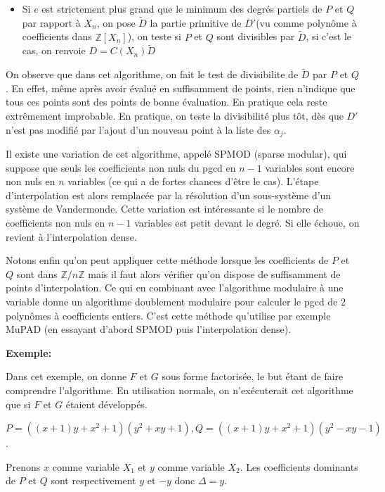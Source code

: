 \documentclass[a4paper,11pt]{book}
\begin{document}
\begin{giacjshere}
\begin{enumerate}
\begin{itemize}
\begin{itemize}
      \item Si $e$ est strictement plus grand que le minimum des degrés
      partiels de $P$ et $Q$ par rapport à $X_n$, on pose $\tilde{D}$ la
      partie primitive de $D' $(vu comme polynôme à coefficients dans
      $\mathbb{Z} [ X_n ]$), on teste si $P$ et $Q$ sont divisibles par
      $\tilde{D}$, si c'est le cas, on renvoie $D = C ( X_n ) \tilde{D}$
    \end{itemize}
  \end{itemize}
\end{enumerate}
On observe que dans cet algorithme, on fait le test de divisibilite de
$\tilde{D}$ par $P$ et $Q$. En effet, même après avoir évalué en suffisamment
de points, rien n'indique que tous ces points sont des points de bonne
évaluation. En pratique cela reste extrêmement improbable. En pratique, on
teste la divisibilité plus tôt, dès que $D'$ n'est pas modifié par l'ajout
d'un nouveau point à la liste des $\alpha_j$.

Il existe une variation de cet algorithme, appelé SPMOD (sparse modular), qui
suppose que seuls les coefficients non nuls du pgcd en $n - 1$ variables sont
encore non nuls en $n$ variables (ce qui a de fortes chances d'être le cas).
L'étape d'interpolation est alors remplacée par la résolution d'un
sous-système d'un système de Vandermonde. Cette variation est intéressante si
le nombre de coefficients non nuls en $n - 1$ variables est petit devant le
degré. Si elle échoue, on revient à l'interpolation dense.

Notons enfin qu'on peut appliquer cette méthode lorsque les coefficients de
$P$ et $Q$ sont dans $\mathbb{Z} / n \mathbb{Z}$ mais il faut alors vérifier
qu'on dispose de suffisamment de points d'interpolation. Ce qui en combinant
avec l'algorithme modulaire à une variable donne un algorithme doublement
modulaire pour calculer le pgcd de 2 polynômes à coefficients entiers. C'est
cette méthode qu'utilise par exemple MuPAD (en essayant d'abord SPMOD puis
l'interpolation dense).

{\bf{Exemple:}}

Dans cet exemple, on donne $F$ et $G$ sous forme factorisée, le but étant de
faire comprendre l'algorithme. En utilisation normale, on n'exécuterait cet
algorithme que si $F$ et $G$ étaient développés.

$P = (( x + 1 ) y + x^2 + 1 ) ( y^2 + x y + 1 ), Q = (( x + 1 ) y +
x^2 + 1 ) ( y^2 - x y - 1 )$.

Prenons $x$ comme variable $X_1$ et $y$ comme variable $X_2$. Les coefficients
dominants de $P$ et $Q$ sont respectivement $y$ et $- y$ donc $\Delta = y$.


\end{giacjshere}
\end{document}
